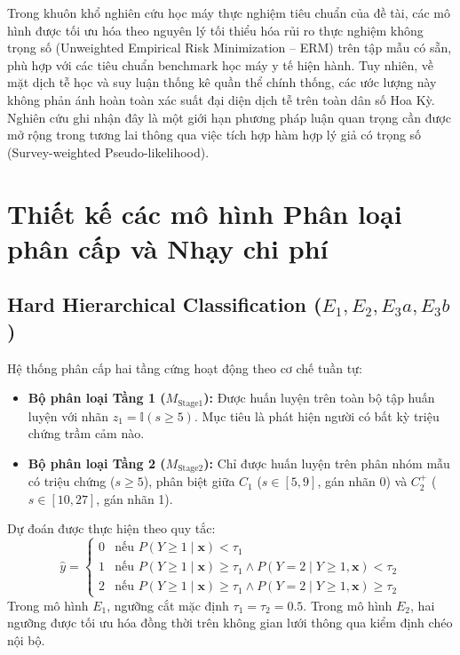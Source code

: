 Trong khuôn khổ nghiên cứu học máy thực nghiệm tiêu chuẩn của đề tài, các mô hình được tối ưu hóa theo nguyên lý tối thiểu hóa rủi ro thực nghiệm không trọng số (Unweighted Empirical Risk Minimization -- ERM) trên tập mẫu có sẵn, phù hợp với các tiêu chuẩn benchmark học máy y tế hiện hành. Tuy nhiên, về mặt dịch tễ học và suy luận thống kê quần thể chính thống, các ước lượng này không phản ánh hoàn toàn xác suất đại diện dịch tễ trên toàn dân số Hoa Kỳ. Nghiên cứu ghi nhận đây là một giới hạn phương pháp luận quan trọng cần được mở rộng trong tương lai thông qua việc tích hợp hàm hợp lý giả có trọng số (Survey-weighted Pseudo-likelihood).

\section{Thiết kế các mô hình Phân loại phân cấp và Nhạy chi phí}
\label{sec:thiet-ke-hierarchical}

\subsection{Hard Hierarchical Classification ($E_1, E_2, E_3a, E_3b$)}
Hệ thống phân cấp hai tầng cứng hoạt động theo cơ chế tuần tự:
\begin{itemize}
    \item \textbf{Bộ phân loại Tầng 1 ($M_{\text{Stage1}}$):} Được huấn luyện trên toàn bộ tập huấn luyện với nhãn $z_1 = \mathbb{I}(s \ge 5)$. Mục tiêu là phát hiện người có bất kỳ triệu chứng trầm cảm nào.
    \item \textbf{Bộ phân loại Tầng 2 ($M_{\text{Stage2}}$):} Chỉ được huấn luyện trên phân nhóm mẫu có triệu chứng ($s \ge 5$), phân biệt giữa $C_1$ ($s \in [5, 9]$, gán nhãn 0) và $C_2^+$ ($s \in [10, 27]$, gán nhãn 1).
\end{itemize}

Dự đoán được thực hiện theo quy tắc:
\begin{equation}
    \hat{y} = \begin{cases} 0 & \text{nếu } P(Y \ge 1 \mid \mathbf{x}) < \tau_1 \\ 1 & \text{nếu } P(Y \ge 1 \mid \mathbf{x}) \ge \tau_1 \land P(Y = 2 \mid Y \ge 1, \mathbf{x}) < \tau_2 \\ 2 & \text{nếu } P(Y \ge 1 \mid \mathbf{x}) \ge \tau_1 \land P(Y = 2 \mid Y \ge 1, \mathbf{x}) \ge \tau_2 \end{cases}
\end{equation}
Trong mô hình $E_1$, ngưỡng cắt mặc định $\tau_1 = \tau_2 = 0.5$. Trong mô hình $E_2$, hai ngưỡng được tối ưu hóa đồng thời trên không gian lưới thông qua kiểm định chéo nội bộ.

